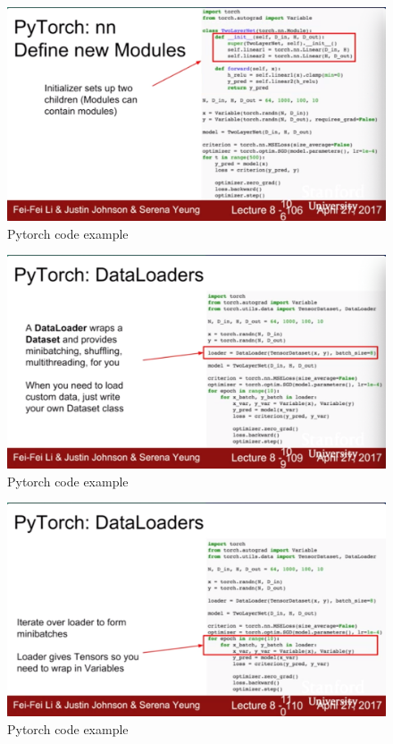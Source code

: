 \documentclass[11pt]{article}
\begin{document}
\begin{figure}[h]
\centering
\captionsetup{justification=centering}
\includegraphics[width=1\linewidth]{L716.pdf}
\caption{ Pytorch code example}
\label{fig:L716}
\end{figure}

\begin{figure}[h]
\centering
\captionsetup{justification=centering}
\includegraphics[width=1\linewidth]{L717.pdf}
\caption{ Pytorch code example}
\label{fig:L717}
\end{figure}

\begin{figure}[h]
\centering
\captionsetup{justification=centering}
\includegraphics[width=1\linewidth]{L718.pdf}
\caption{ Pytorch code example}
\label{fig:L718}
\end{figure}
\end{document}
